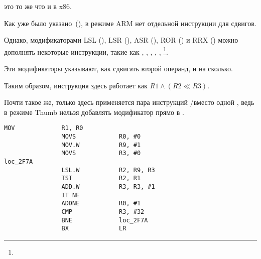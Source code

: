 


\TST это то же что и \TEST в x86.

Как уже было указано~(),
в режиме ARM нет отдельной инструкции для сдвигов.

Однако, модификаторами 
LSL (), 
LSR (), 
ASR (), 
ROR () и
RRX () можно дополнять некоторые инструкции, такие как \MOV, \TST,
\CMP, \ADD, \SUB, \RSB\footnote{\DataProcessingInstructionsFootNote}.

Эти модификаторы указывают, как сдвигать второй операнд, и на сколько.

Таким образом, инструкция   здесь работает как $R1 \land (R2 \ll R3)$.


Почти такое же, только здесь применяется пара инструкций /\TST вместо одной \TST,
ведь в режиме Thumb нельзя добавлять модификатор \LSL прямо в \TST.

\begin{lstlisting}[label=ARM_leaf_example5]
                MOV             R1, R0
                MOVS            R0, #0
                MOV.W           R9, #1
                MOVS            R3, #0
loc_2F7A
                LSL.W           R2, R9, R3
                TST             R2, R1
                ADD.W           R3, R3, #1
                IT NE
                ADDNE           R0, #1
                CMP             R3, #32
                BNE             loc_2F7A
                BX              LR
\end{lstlisting}


